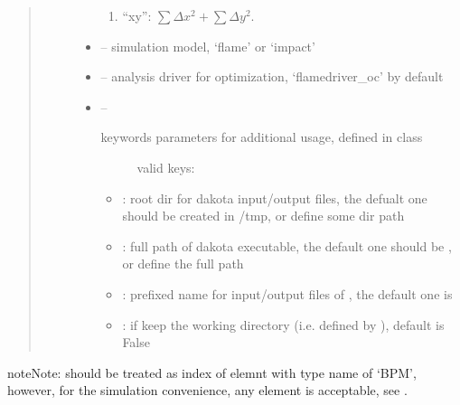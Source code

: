 \documentclass[letterpaper,10pt,english]{sphinxmanual}
\begin{document}
\begin{fulllineitems}
\begin{quote}
\begin{description}
\begin{itemize}
\begin{enumerate}
\item {} 
``xy'': \(\sum \Delta x^2 + \sum \Delta y^2\).

\end{enumerate}


\item {} 
 -- simulation model, `flame' or `impact'

\item {} 
 -- analysis driver for optimization, `flamedriver\_oc' by default

\item {} 
 -- \begin{description}
\item[{keywords parameters for additional usage, defined in  class}] \leavevmode
valid keys:

\end{description}
\begin{itemize}
\item {} 
: root dir for dakota input/output files,
the defualt one should be created in /tmp, or define some dir path

\item {} 
: full path of dakota executable,
the default one should be , or define the full path

\item {} 
: prefixed name for input/output files of , 
the default one is 

\item {} 
: if keep the working directory (i.e. defined by ), 
default is False

\end{itemize}


\end{itemize}

\end{description}\end{quote}

\begin{sphinxadmonition}{note}{Note:}
 should be treated as index of elemnt with type name of `BPM',
however, for the simulation convenience, any element is acceptable, see {\hyperref[\detokenize{src/apidocs/genopt:genopt.DakotaOC.set_bpms}]{}}.
\end{sphinxadmonition}


\end{fulllineitems}
\end{document}
